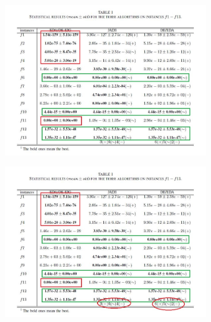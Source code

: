 \documentclass[xcolor=dvipsnames]{beamer}
\begin{document}
    \begin{frame}
    \begin{figure}[H]
        \graphicspath{{figs/}}
        \includegraphics[width=0.8\textwidth]{tab1-2.jpg}
    \end{figure}
    \end{frame}

    \begin{frame}
    \begin{figure}[H]
        \graphicspath{{figs/}}
        \includegraphics[width=0.8\textwidth]{tab1-3.jpg}
    \end{figure}
    \end{frame}
\end{document}
